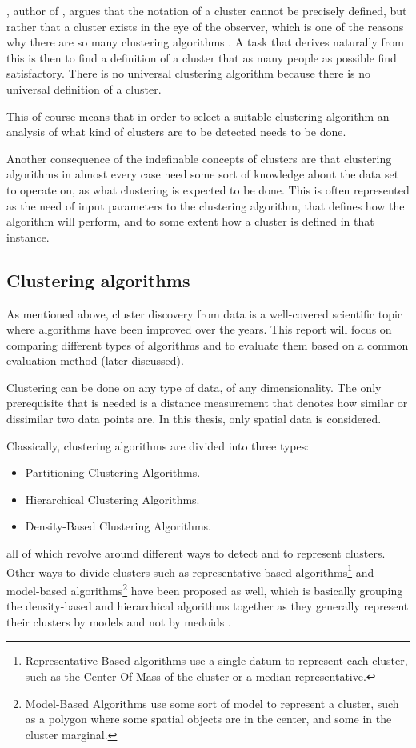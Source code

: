 \citeauthor{why-so-many-clustering-algorithms}, author of 
,
argues that the notation of a cluster cannot be 
precisely defined, but rather that a cluster exists in the eye of the observer, which 
is one of the reasons why there are so many clustering algorithms 
\cite{why-so-many-clustering-algorithms}. A task that derives naturally 
from this is then to find a definition of a cluster that as many people as 
possible find satisfactory. There is no universal clustering algorithm 
because there is no universal definition of a cluster.

This of course means that in order to select a suitable clustering 
algorithm an analysis of what kind of clusters are to be detected 
needs to be done.

Another consequence of the indefinable concepts of clusters are that 
clustering algorithms in almost every case need some sort of knowledge 
about the data set to operate on, as what clustering is expected 
to be done. This is often represented as the need of input parameters
to the clustering algorithm, that defines how the algorithm will 
perform, and to some extent how a cluster is defined in that instance.

\subsection{Clustering algorithms}

As mentioned above, cluster discovery from data is a well-covered scientific 
topic where algorithms have been improved over the years. This report will 
focus on comparing different types of algorithms and to evaluate them based on 
a common evaluation method (later discussed). 

Clustering can be done on any type of data, of any dimensionality. The 
only prerequisite that is needed is a distance measurement that denotes
how similar or dissimilar two data points are. In this thesis, only 
spatial data is considered.

Classically, clustering algorithms are divided into three types: 
\begin{itemize}
    \item Partitioning Clustering Algorithms.
    \item Hierarchical Clustering Algorithms.
    \item Density-Based Clustering Algorithms.
\end{itemize}
all of which revolve around different ways to detect and to represent 
clusters. Other ways to divide clusters such as representative-based 
algorithms\footnote{
    Representative-Based algorithms use a single datum to represent each
    cluster, such as the Center Of Mass of the cluster or a 
    median representative. }
and model-based algorithms\footnote{
    Model-Based Algorithms use some sort of model to represent a 
    cluster, such as a polygon where some spatial objects are in the 
    center, and some in the cluster marginal. }
have been proposed as well, which is basically grouping the density-based 
and hierarchical algorithms together as they generally represent their 
clusters by models and not by medoids \cite{why-so-many-clustering-algorithms}.

